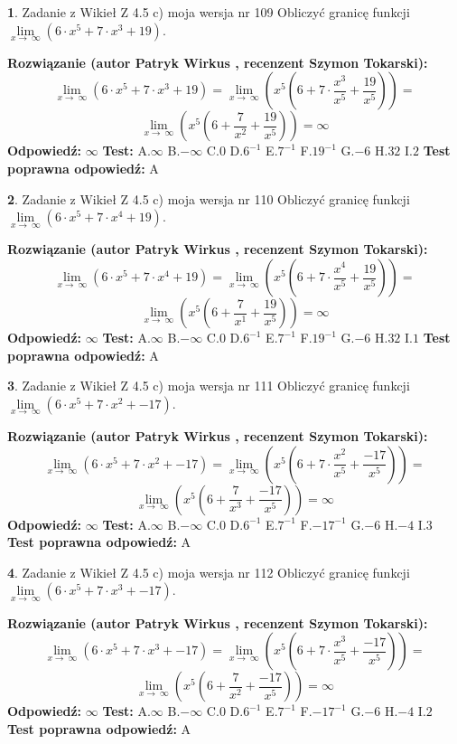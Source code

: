 \documentclass[12pt, a4paper]{article}
\theoremstyle{definition} %
\newtheorem{zad}{}
\newcommand{\zadStart}[1]{\begin{zad}#1\newline}
\newcommand{\zadStop}{\end{zad}}
\newcommand{\rozwStart}[2]{\noindent \textbf{Rozwiązanie (autor #1 , recenzent #2): }\newline}
\newcommand{\rozwStop}{\newline}
\newcommand{\odpStart}{\noindent \textbf{Odpowiedź:}\newline}
\newcommand{\odpStop}{\newline}
\newcommand{\testStart}{\noindent \textbf{Test:}\newline}
\newcommand{\testStop}{\newline}
\newcommand{\kluczStart}{\noindent \textbf{Test poprawna odpowiedź:}\newline}
\newcommand{\kluczStop}{\newline}
\begin{document}
\zadStart{Zadanie z Wikieł Z 4.5 c) moja wersja nr 109}
Obliczyć granicę funkcji  $\lim\limits_{x\to\ \infty}(6 \cdot x^{5}+7 \cdot x^{3}+19)$.
\zadStop
\rozwStart{Patryk Wirkus}{Szymon Tokarski}
$$\lim\limits_{x\to\ \infty}(6 \cdot x^{5}+7 \cdot x^{3}+19) = \lim\limits_{x\to\ \infty}(x^{5}(6 +7 \cdot \frac{x^{3}}{x^{5}}+\frac{19}{x^{5}})) =$$ $$\lim\limits_{x\to\ \infty}(x^{5}(6 +\frac{7}{x^{2}}+\frac{19}{x^{5}})) =\infty$$
\rozwStop
\odpStart
$\infty$
\odpStop
\testStart
A.$\infty$ B.$-\infty$ C.$0$ D.$6^{-1}$ E.$7^{-1}$
F.$19^{-1}$ G.$-6$
H.$32$
I.$2$
\testStop
\kluczStart
A
\kluczStop



\zadStart{Zadanie z Wikieł Z 4.5 c) moja wersja nr 110}
Obliczyć granicę funkcji  $\lim\limits_{x\to\ \infty}(6 \cdot x^{5}+7 \cdot x^{4}+19)$.
\zadStop
\rozwStart{Patryk Wirkus}{Szymon Tokarski}
$$\lim\limits_{x\to\ \infty}(6 \cdot x^{5}+7 \cdot x^{4}+19) = \lim\limits_{x\to\ \infty}(x^{5}(6 +7 \cdot \frac{x^{4}}{x^{5}}+\frac{19}{x^{5}})) =$$ $$\lim\limits_{x\to\ \infty}(x^{5}(6 +\frac{7}{x^{1}}+\frac{19}{x^{5}})) =\infty$$
\rozwStop
\odpStart
$\infty$
\odpStop
\testStart
A.$\infty$ B.$-\infty$ C.$0$ D.$6^{-1}$ E.$7^{-1}$
F.$19^{-1}$ G.$-6$
H.$32$
I.$1$
\testStop
\kluczStart
A
\kluczStop



\zadStart{Zadanie z Wikieł Z 4.5 c) moja wersja nr 111}
Obliczyć granicę funkcji  $\lim\limits_{x\to\ \infty}(6 \cdot x^{5}+7 \cdot x^{2}+-17)$.
\zadStop
\rozwStart{Patryk Wirkus}{Szymon Tokarski}
$$\lim\limits_{x\to\ \infty}(6 \cdot x^{5}+7 \cdot x^{2}+-17) = \lim\limits_{x\to\ \infty}(x^{5}(6 +7 \cdot \frac{x^{2}}{x^{5}}+\frac{-17}{x^{5}})) =$$ $$\lim\limits_{x\to\ \infty}(x^{5}(6 +\frac{7}{x^{3}}+\frac{-17}{x^{5}})) =\infty$$
\rozwStop
\odpStart
$\infty$
\odpStop
\testStart
A.$\infty$ B.$-\infty$ C.$0$ D.$6^{-1}$ E.$7^{-1}$
F.$-17^{-1}$ G.$-6$
H.$-4$
I.$3$
\testStop
\kluczStart
A
\kluczStop



\zadStart{Zadanie z Wikieł Z 4.5 c) moja wersja nr 112}
Obliczyć granicę funkcji  $\lim\limits_{x\to\ \infty}(6 \cdot x^{5}+7 \cdot x^{3}+-17)$.
\zadStop
\rozwStart{Patryk Wirkus}{Szymon Tokarski}
$$\lim\limits_{x\to\ \infty}(6 \cdot x^{5}+7 \cdot x^{3}+-17) = \lim\limits_{x\to\ \infty}(x^{5}(6 +7 \cdot \frac{x^{3}}{x^{5}}+\frac{-17}{x^{5}})) =$$ $$\lim\limits_{x\to\ \infty}(x^{5}(6 +\frac{7}{x^{2}}+\frac{-17}{x^{5}})) =\infty$$
\rozwStop
\odpStart
$\infty$
\odpStop
\testStart
A.$\infty$ B.$-\infty$ C.$0$ D.$6^{-1}$ E.$7^{-1}$
F.$-17^{-1}$ G.$-6$
H.$-4$
I.$2$
\testStop
\kluczStart
A
\kluczStop
\end{document}
